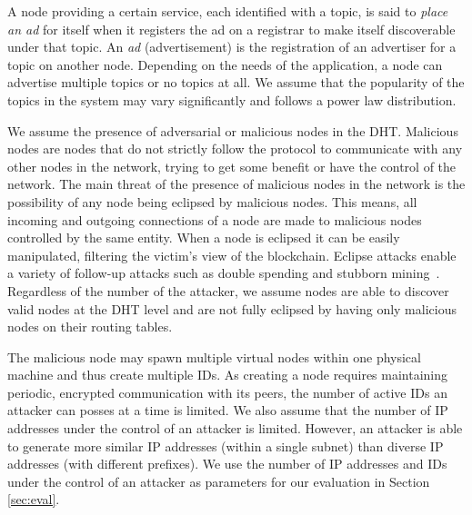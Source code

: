 A node providing a certain service,  each identified with a topic,  is said to \emph{place an ad} for itself when it registers the ad on a registrar to make itself discoverable under that topic. 
An \emph{ad} (\ie advertisement) is the registration of an advertiser for a topic on another node. Depending on the needs of the application, a node can advertise multiple topics or no topics at all. 
We assume that the popularity of the topics in the system may vary significantly and follows a power law distribution. 

We assume the presence of adversarial or malicious nodes in the DHT. 
Malicious nodes are nodes that do not strictly follow the protocol to communicate with any other nodes in the network,  trying to get some benefit or have the control of the network.
The main threat of the presence of malicious nodes in the network is the possibility of any node being eclipsed by malicious nodes.
This means,  all incoming and outgoing connections of a node are made to malicious nodes controlled by the same entity. 
When a node is eclipsed it can be easily manipulated,
filtering the victim’s view of the blockchain.  
Eclipse attacks
enable a variety of follow-up attacks such as double spending
and stubborn mining~\cite{stubborn}.
Regardless of the number of the attacker, we assume nodes are able to discover valid nodes at the DHT level and are not fully eclipsed by having only malicious nodes on their routing tables.
%

The malicious node may spawn multiple virtual nodes within one physical machine and thus create multiple IDs. 
As creating a node requires maintaining periodic, encrypted communication with its peers, the number of active IDs an attacker can posses at a time is limited. 
We also assume that the number of IP addresses under the control of an attacker is limited. 
However, an attacker is able to generate more similar IP addresses (within a single subnet) than diverse IP addresses (with different prefixes). 
We use the number of IP addresses and IDs under the control of an attacker as parameters for our evaluation in Section \ref{sec:eval}.


